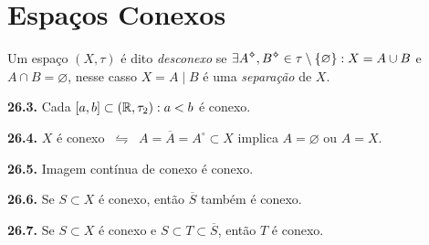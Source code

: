 \section{Espaços Conexos}
 
\begin{definition}
    Um espaço \((X,\tau)\) é dito \emph{desconexo} se \(\exists A\ab, B\ab \in \tau \setminus \{\varnothing\} : X = A \cup B\) e \(A \cap B = \varnothing\), nesse casso \(X = A \mid B\) é uma \emph{separação} de \(X\). 
\end{definition}

\begin{proposition}
    \textbf{26.3.} Cada \([a,b] \subset (\mathbb{R}, \tau_2) : a < b\) é conexo. 
\end{proposition}

\begin{proposition}
    \textbf{26.4.} \(X\) é conexo \(\ \leftrightharpoons \ \) \(A = \overline{A} = A^\circ \subset X \) implica \(A = \varnothing\) ou \(A = X\). 
\end{proposition}

\begin{proposition}
    \textbf{26.5.} Imagem contínua de conexo é conexo. 
\end{proposition}

\hypertarget{prop266}{}
\begin{proposition}
    \textbf{26.6.} Se \(S \subset X\)  é conexo, então \(\overline{S}\) também é conexo. 
\end{proposition}

\hypertarget{coro267}{}
\begin{corollary}
    \textbf{26.7.} Se \(S \subset X\) é conexo e \(S \subset T \subset \overline{S}\), então \(T\) é conexo. 
\end{corollary}




